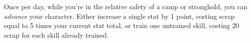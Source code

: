 
Once per day, while you're in the relative safety of a camp or stronghold, you can \emph{advance} your character. Either increase a single stat by 1 point, costing scrap equal to 5 times your current stat total, or train one untrained skill, costing 20 scrap for each skill already trained.
